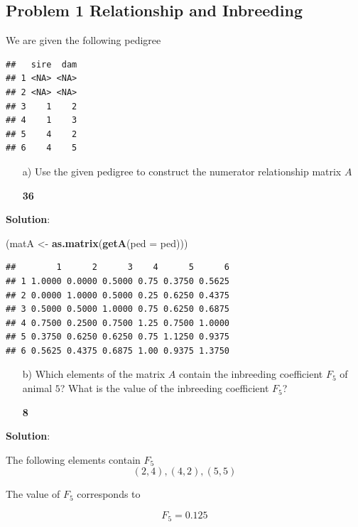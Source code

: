 \documentclass[]{article}
\newenvironment{Shaded}{\begin{snugshade}}{\end{snugshade}}
\newcommand{\KeywordTok}[1]{\textcolor[rgb]{0.13,0.29,0.53}{\textbf{#1}}}
\newcommand{\DataTypeTok}[1]{\textcolor[rgb]{0.13,0.29,0.53}{#1}}
\newcommand{\StringTok}[1]{\textcolor[rgb]{0.31,0.60,0.02}{#1}}
\newcommand{\NormalTok}[1]{#1}
\newcommand{\points}[1]
{\begin{flushright}\textbf{#1}\end{flushright}}
\newcommand{\sol}
{\vspace{2ex}\textbf{Solution}:}
\begin{document}
\clearpage
\pagebreak

\subsection{Problem 1 Relationship and
Inbreeding}\label{problem-1-relationship-and-inbreeding}

We are given the following pedigree

\begin{verbatim}
##   sire  dam
## 1 <NA> <NA>
## 2 <NA> <NA>
## 3    1    2
## 4    1    3
## 5    4    2
## 6    4    5
\end{verbatim}

\begin{enumerate}
\item[a)] Use the given pedigree to construct the numerator relationship matrix $A$
\points{36}
\end{enumerate}

\sol

\begin{Shaded}
\begin{Highlighting}[]
\NormalTok{(matA <-}\StringTok{ }\KeywordTok{as.matrix}\NormalTok{(}\KeywordTok{getA}\NormalTok{(}\DataTypeTok{ped =}\NormalTok{ ped)))}
\end{Highlighting}
\end{Shaded}

\begin{verbatim}
##        1      2      3    4      5      6
## 1 1.0000 0.0000 0.5000 0.75 0.3750 0.5625
## 2 0.0000 1.0000 0.5000 0.25 0.6250 0.4375
## 3 0.5000 0.5000 1.0000 0.75 0.6250 0.6875
## 4 0.7500 0.2500 0.7500 1.25 0.7500 1.0000
## 5 0.3750 0.6250 0.6250 0.75 1.1250 0.9375
## 6 0.5625 0.4375 0.6875 1.00 0.9375 1.3750
\end{verbatim}

\clearpage
\pagebreak

\begin{enumerate}
\item[b)] Which elements of the matrix $A$ contain the inbreeding coefficient $F_5$ of animal $5$? What is the value of the inbreeding coefficient $F_5$?
\points{8}
\end{enumerate}

\sol

The following elements contain \(F_5\) \[(2,4), (4,2), (5,5)\]

The value of \(F_5\) corresponds to

\[F_5 = 0.125\]
\end{document}

